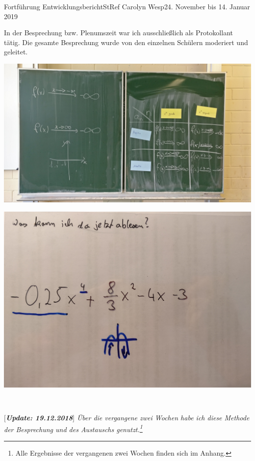 \documentclass[oneside,openany,headings=optiontotoc,11pt,numbers=noenddot]{article}
\begin{document}
\begin{worksheet}{Fortführung Entwicklungsbericht}{StRef\grq{} Carolyn Wesp}{24. November bis 14. Januar 2019}
\begin{center}
		\end{center}
		In der Besprechung bzw. Plenumszeit war ich ausschließlich als Protokollant tätig. Die gesamte Besprechung wurde von den einzelnen Schülern moderiert und geleitet.\\
		\par\noindent
		\begin{minipage}{0.49\textwidth}
			\includegraphics[width=\textwidth,align=t]{../Tabelle_VerhaltenMBsp.jpg}
		\end{minipage}
		\hfill
		\begin{minipage}{0.49\textwidth}
			\includegraphics[width=\textwidth,align=t]{../VerhaltenAblesen.jpg}
		\end{minipage}\\
		\par
		\setlength{\leftskip}{1cm}
		\noindent
		\textit{\textbf{$\lbrack$Update: 19.12.2018$\rbrack$} Über die vergangene zwei Wochen habe ich diese Methode der Besprechung und des Austauschs genutzt.\footnote{Alle Ergebnisse der vergangenen zwei Wochen finden sich im Anhang.}\\
}
\end{worksheet}
\end{document}
